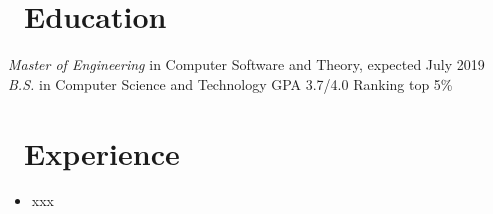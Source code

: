 \documentclass{style/resume}
\begin{document}

\newcommand{\resumeItem}[2]{
  \item\small{
    \textbf{#1}{: #2 \vspace{-2pt}}
  }
}
\newcommand{\resumeSubheading}[4]{
  \vspace{-1pt}\item
    \begin{tabular*}{0.97\textwidth}[t]{l@{\extracolsep{\fill}}r}
      \textbf{#1} & #2 \\
      \textit{\small#3} & \textit{\small #4} \\
    \end{tabular*}\vspace{-5pt}
}

\newcommand{\resumeSubItem}[2]{\resumeItem{#1}{#2}\vspace{-4pt}}

\renewcommand{\labelitemii}{$\circ$}

\newcommand{\resumeSubHeadingListStart}{\begin{itemize}[leftmargin=*]}
\newcommand{\resumeSubHeadingListEnd}{\end{itemize}}
\newcommand{\resumeItemListStart}{\begin{itemize}}
\newcommand{\resumeItemListEnd}{\end{itemize}\vspace{-5pt}}




\section{\faGraduationCap\ Education}
\textit{Master of Engineering} {in Computer Software and Theory,} {expected July 2019}
\textit{B.S.} in Computer Science and Technology GPA 3.7/4.0   Ranking top 5\%


\section{\faUsers\ Experience}
\vspace{-10pt}
\begin{itemize}
  \item xxx
\end{itemize}
\end{document}
